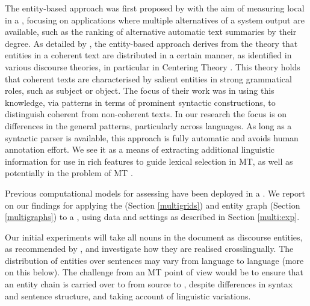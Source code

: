 \documentclass[output=paper]{langsci/langscibook.cls}
\begin{document}
The entity-based approach was first proposed by \citet{barzilay-lapata:2005:ACL} with the aim of measuring local  in a , focusing on applications where multiple alternatives of a system output are available, such as the ranking of alternative automatic text summaries by their  degree. 
As detailed by \citet{Barzilay:2008}, the entity-based approach derives from the theory that entities in a coherent text are distributed in a certain manner, as identified in various discourse theories, in particular in Centering Theory \citep{Grosz:1995}. This theory holds that coherent texts are characterised by salient entities in strong grammatical roles, such as subject or object.
The focus of their work \citep{Barzilay:2008} was in using this knowledge, via patterns in terms of prominent syntactic constructions, to distinguish coherent from non-coherent texts. In our research the focus is on differences in the general patterns, particularly across languages.
As long as a syntactic parser is available, this approach is fully automatic and avoids human annotation effort. We see it as a means of extracting additional linguistic information for use in rich features to guide lexical selection in MT, as well as potentially in the problem of MT . 

Previous computational models for assessing  have been deployed in a  \citep{Lapata:2005,Barzilay:2008,Elsner:2007,Elsner:2011,Burstein,Guinaudeau}. We report on our findings for applying the  (Section  \ref{multigrids}) and entity graph (Section \ref{multigraphs}) to a , using data and settings as described in Section \ref{multi:exp}.

Our initial experiments will take all nouns in the document as discourse entities, as recommended by \citet{Elsner:2011}, and investigate how they are realised crosslingually.
The distribution of entities over sentences may vary from language to language (more on this below). The challenge from an MT point of view would be to ensure that an entity chain is carried over to from source to , despite differences in syntax and sentence structure, and taking account of linguistic variations.
 
\end{document}

